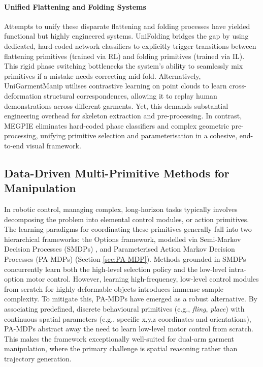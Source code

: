 \documentclass[journal]{IEEEtran}
\begin{document}
\paragraph{Unified Flattening and Folding Systems} Attempts to unify these disparate flattening and folding processes have yielded functional but highly engineered systems. UniFolding \cite{xue2023unifolding} bridges the gap by using dedicated, hard-coded network classifiers to explicitly trigger transitions between flattening primitives (trained via RL) and folding primitives (trained via IL). This rigid phase switching bottlenecks the system's ability to seamlessly mix primitives if a mistake needs correcting mid-fold. Alternatively, UniGarmentManip \cite{wu2024unigarmentmanip} utilises contrastive learning on point clouds to learn cross-deformation structural correspondences, allowing it to replay human demonstrations across different garments. Yet, this demands substantial engineering overhead for skeleton extraction and pre-processing. In contrast, MEGPIE eliminates hard-coded phase classifiers and complex geometric pre-processing, unifying primitive selection and parameterisation in a cohesive, end-to-end visual framework.

\subsection{Data-Driven Multi-Primitive Methods for Manipulation}
\label{sec:multi_primitive_control}

In robotic control, managing complex, long-horizon tasks typically involves decomposing the problem into elemental control modules, or action primitives. The learning paradigms for coordinating these primitives generally fall into two hierarchical frameworks: the Options framework, modelled via Semi-Markov Decision Processes (SMDPs) \cite{sutton1999between}, and Parameterised Action Markov Decision Processes (PA-MDPs) \cite{masson2016reinforcement} (Section \ref{sec:PA-MDP}). Methods grounded in SMDPs concurrently learn both the high-level selection policy and the low-level intra-option motor control. However, learning high-frequency, low-level control modules from scratch for highly deformable objects introduces immense sample complexity. To mitigate this, PA-MDPs have emerged as a robust alternative. By associating predefined, discrete behavioural primitives (e.g., \textit{fling}, \textit{place}) with continuous spatial parameters (e.g., specific x,y,z coordinates and orientations), PA-MDPs abstract away the need to learn low-level motor control from scratch. This makes the framework exceptionally well-suited for dual-arm garment manipulation, where the primary challenge is spatial reasoning rather than trajectory generation.
\end{document}
